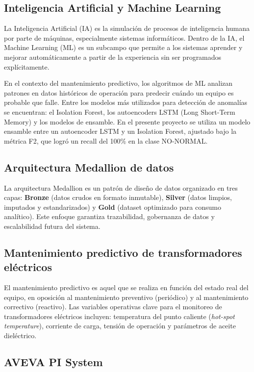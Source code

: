 \documentclass{univalle-perfil}
\begin{document}
\subsection{Inteligencia Artificial y Machine Learning}

La Inteligencia Artificial (IA) es la simulación de procesos de inteligencia humana por
parte de máquinas, especialmente sistemas informáticos. Dentro de la IA, el Machine
Learning (ML) es un subcampo que permite a los sistemas aprender y mejorar
automáticamente a partir de la experiencia sin ser programados explícitamente.

En el contexto del mantenimiento predictivo, los algoritmos de ML analizan patrones
en datos históricos de operación para predecir cuándo un equipo es probable que
falle. Entre los modelos más utilizados para detección de anomalías se encuentran:
el Isolation Forest, los autoencoders LSTM (Long Short-Term Memory) y los modelos
de ensamble. En el presente proyecto se utiliza un modelo ensamble entre un
autoencoder LSTM y un Isolation Forest, ajustado bajo la métrica F2, que logró un
recall del 100\% en la clase NO-NORMAL.

\subsection{Arquitectura Medallion de datos}

La arquitectura Medallion es un patrón de diseño de datos organizado en tres capas:
\textbf{Bronze} (datos crudos en formato inmutable), \textbf{Silver} (datos limpios,
imputados y estandarizados) y \textbf{Gold} (dataset optimizado para consumo
analítico). Este enfoque garantiza trazabilidad, gobernanza de datos y escalabilidad
futura del sistema.

\subsection{Mantenimiento predictivo de transformadores eléctricos}

El mantenimiento predictivo es aquel que se realiza en función del estado real del
equipo, en oposición al mantenimiento preventivo (periódico) y al mantenimiento
correctivo (reactivo). Las variables operativas clave para el monitoreo de
transformadores eléctricos incluyen: temperatura del punto caliente (\textit{hot-spot
temperature}), corriente de carga, tensión de operación y parámetros de aceite
dieléctrico.

\subsection{AVEVA PI System}
\end{document}
